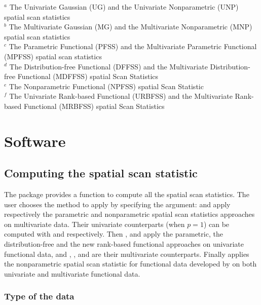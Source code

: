 \begin{table}[htbp]
\begin{scriptsize}
$^a$ The Univariate Gaussian (UG) and the Univariate Nonparametric (UNP) spatial scan statistics \\
$^b$ The Multivariate Gaussian (MG) and the Multivariate Nonparametric (MNP) spatial scan statistics \\
$^c$ The Parametric Functional (PFSS) and the Multivariate Parametric Functional (MPFSS) spatial scan statistics \\
$^d$ The Distribution-free Functional (DFFSS) and the Multivariate Distribution-free Functional (MDFFSS) spatial Scan Statistics \\
$^e$ The Nonparametric Functional (NPFSS) spatial Scan Statistic \\
$^f$ The Univariate Rank-based Functional (URBFSS) and the Multivariate Rank-based Functional (MRBFSS) spatial Scan Statistics \\

\label{tab:computation_time}
\end{scriptsize}
\end{table}

\section{Software} \label{sec:implementation}


\subsection{Computing the spatial scan statistic}\label{subsec:computing}

The package  provides a function  to compute all the spatial scan statistics. The user chooses the method to apply by specifying the  argument:  and  apply respectively the parametric and nonparametric spatial scan statistics approaches on multivariate data. Their univariate counterparts (when $p=1$) can be computed with  and  respectively.
Then ,  and  apply the parametric, the distribution-free and the new rank-based functional approaches on univariate functional data, and , , and  are their multivariate counterparts. 
Finally  applies the nonparametric spatial scan statistic for functional data developed by \citet{wilco_cucala} on both univariate and multivariate functional data. 

\subsubsection{Type of the data}

